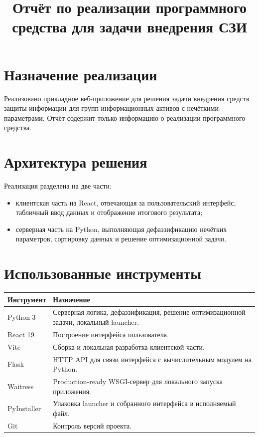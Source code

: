 \documentclass[12pt,a4paper]{article}
\title{Отчёт по реализации программного средства для задачи внедрения СЗИ}
\author{}
\date{}
\begin{document}
\maketitle

\section*{Назначение реализации}
Реализовано прикладное веб-приложение для решения задачи внедрения средств защиты информации для групп информационных активов с нечёткими параметрами. Отчёт содержит только информацию о реализации программного средства.

\section*{Архитектура решения}
Реализация разделена на две части:
\begin{itemize}
    \item клиентская часть на React, отвечающая за пользовательский интерфейс, табличный ввод данных и отображение итогового результата;
    \item серверная часть на Python, выполняющая дефаззификацию нечётких параметров, сортировку данных и решение оптимизационной задачи.
\end{itemize}

\section*{Использованные инструменты}
\begin{longtable}{|p{4cm}|p{10cm}|}
\hline
\textbf{Инструмент} & \textbf{Назначение} \\\hline
Python 3 & Серверная логика, дефаззификация, решение оптимизационной задачи, локальный launcher. \\\hline
React 19 & Построение интерфейса пользователя. \\\hline
Vite & Сборка и локальная разработка клиентской части. \\\hline
Flask & HTTP API для связи интерфейса с вычислительным модулем на Python. \\\hline
Waitress & Production-ready WSGI-сервер для локального запуска приложения. \\\hline
PyInstaller & Упаковка launcher и собранного интерфейса в исполняемый файл. \\\hline
Git & Контроль версий проекта. \\\hline
\end{longtable}
\end{document}
